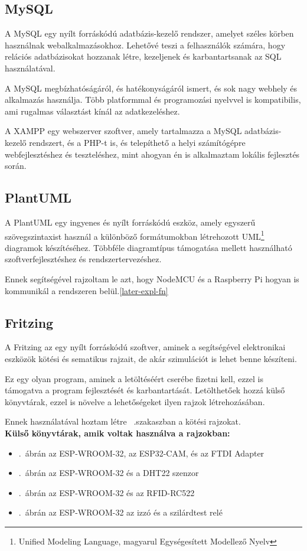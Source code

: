 \documentclass[
]{thesis-ekf}
\theoremstyle{definition}
\theoremstyle{remark}
\begin{document}
	\subsection{MySQL}
	A MySQL egy nyílt forráskódú adatbázis-kezelő rendszer, amelyet széles körben használnak webalkalmazásokhoz. Lehetővé teszi a felhasználók számára, hogy relációs adatbázisokat hozzanak létre, kezeljenek és karbantartsanak az SQL használatával. 
	
	A MySQL megbízhatóságáról, és hatékonyságáról ismert, és sok nagy webhely és alkalmazás használja. Több platformmal és programozási nyelvvel is kompatibilis, ami rugalmas választást kínál az adatkezeléshez.
	
	A XAMPP egy webszerver szoftver, amely tartalmazza a MySQL adatbázis-kezelő rendszert, és a PHP-t is, és telepíthető a helyi számítógépre webfejlesztéshez és teszteléshez, mint ahogyan én is alkalmaztam lokális fejlesztés során.
	\subsection{PlantUML}
	A PlantUML egy ingyenes és nyílt forráskódú eszköz, amely egyszerű szövegszintaxist használ a különböző formátumokban létrehozott UML\footnote{Unified Modeling Language, magyarul Egységesített Modellező Nyelv} diagramok készítéséhez. Többféle diagramtípus támogatása mellett használható szoftverfejlesztéshez és rendszertervezéshez.

	Ennek segítségével rajzoltam le azt, hogy NodeMCU és a Raspberry Pi hogyan is kommunikál a rendszeren belül.\ref{later-expl-fn}
	\subsection{Fritzing}
	A Fritzing az egy nyílt forráskódú szoftver, aminek a segítségével elektronikai eszközök kötési és sematikus rajzait, de akár szimulációt is lehet benne készíteni.
	
	Ez egy olyan program, aminek a letöltéséért cserébe fizetni kell, ezzel is támogatva a program fejlesztését és karbantartását. Letölthetőek hozzá külső könyvtárak, ezzel is növelve a lehetőségeket ilyen rajzok létrehozásában.
	
	Ennek használatával hoztam létre ~.szakaszban a kötési rajzokat.\\
	\textbf{Külső könyvtárak, amik voltak használva a rajzokban:}
	\begin{itemize}
		\item {}.~ábrán az ESP-WROOM-32, az ESP32-CAM, és az FTDI Adapter\cite{fritzing-library}
		\item {}.~ábrán az ESP-WROOM-32 és a DHT22 szenzor \cite{fritzing-library}
		\item {}.~ábrán az ESP-WROOM-32\cite{fritzing-library} és az RFID-RC522\cite{fritzing-rfid}
		\item {}.~ábrán az ESP-WROOM-32\cite{fritzing-library} az izzó\cite{fritzing-light} és a szilárdtest relé\cite{fritzing-SSR}
	\end{itemize}
\end{document}
